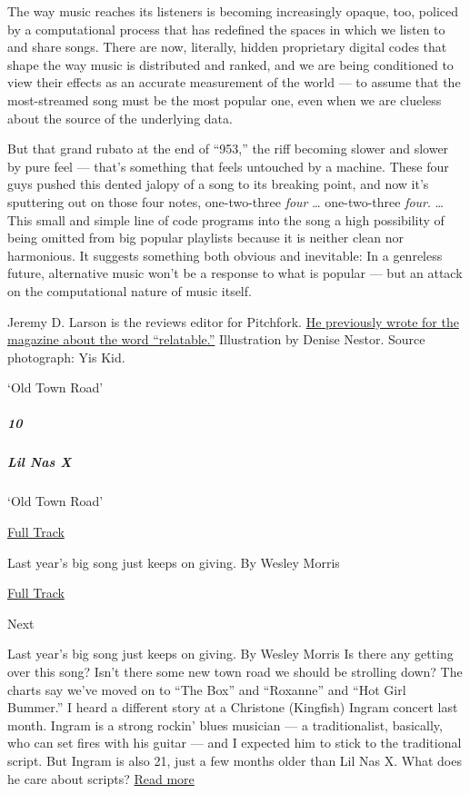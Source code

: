 The way music reaches its listeners is becoming increasingly opaque,
too, policed by a computational process that has redefined the spaces in
which we listen to and share songs. There are now, literally, hidden
proprietary digital codes that shape the way music is distributed and
ranked, and we are being conditioned to view their effects as an
accurate measurement of the world --- to assume that the most-streamed
song must be the most popular one, even when we are clueless about the
source of the underlying data.

But that grand rubato at the end of ``953,'' the riff becoming slower
and slower by pure feel --- that's something that feels untouched by a
machine. These four guys pushed this dented jalopy of a song to its
breaking point, and now it's sputtering out on those four notes,
one-two-three \emph{four} \ldots{} one-two-three \emph{four}. \ldots{}
This small and simple line of code programs into the song a high
possibility of being omitted from big popular playlists because it is
neither clean nor harmonious. It suggests something both obvious and
inevitable: In a genre­less future, alternative music won't be a
response to what is popular --- but an attack on the computational
nature of music itself.

Jeremy D. Larson is the reviews editor for Pitchfork.
\href{https://www.nytimes3xbfgragh.onion/2019/01/08/magazine/the-scourge-of-relatable-in-art-and-politics.html}{He
previously wrote for the magazine about the word ``relatable.''}
Illustration by Denise Nestor. Source photograph: Yis Kid.

`Old Town Road'

\hypertarget{10}{%
\subparagraph{10}\label{10}}

\hypertarget{lil-nas-x}{%
\subparagraph{Lil Nas X}\label{lil-nas-x}}

`Old Town Road'

\href{https://open.spotify.com/track/0F7FA14euOIX8KcbEturGH?si=YS-PEjT0R9KWB9wJWxpYoA}{
Full Track}

Last year's big song just keeps on giving. By Wesley Morris

\href{https://open.spotify.com/track/0F7FA14euOIX8KcbEturGH?si=YS-PEjT0R9KWB9wJWxpYoA}{Full
Track }

Next

Last year's big song just keeps on giving. By Wesley Morris Is there any
getting over this song? Isn't there some new town road we should be
strolling down? The charts say we've moved on to ``The Box'' and
``Roxanne'' and ``Hot Girl Bummer.'' I heard a different story at a
Christone (Kingfish) Ingram concert last month. Ingram is a strong
rockin' blues musician --- a traditionalist, basically, who can set
fires with his guitar --- and I expected him to stick to the traditional
script. But Ingram is also 21, just a few months older than Lil Nas X.
What does he care about scripts?
\href{https://www.nytimes3xbfgragh.onion/interactive/2020/03/11/magazine/lil-nas-x-old-town-road.html}{Read
more}

